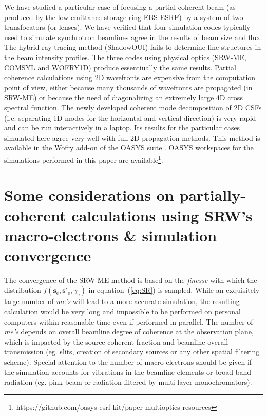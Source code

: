 \documentclass{iucr}              %
\begin{document}
We have studied a particular case of focusing a partial coherent beam (as produced by the low emittance storage ring EBS-ESRF) by a system of two transfocators (or lenses). We have verified that four simulation codes typically used to simulate synchrotron beamlines agree in the results of beam size and flux. The hybrid ray-tracing method (ShadowOUI) fails to determine fine structures in the beam intensity profiles. The three codes using physical optics (SRW-ME, COMSYL and WOFRY1D) produce essentiually the same results. Partial coherence calculations using 2D wavefronts are expensive from the computation point of view, either because many thousands of wavefronts are propagated (in SRW-ME) or because the need of diagonalizing an extremely large 4D cross spectral function. The newly developed coherent mode decomposition of 2D CSFs (i.e. separating 1D modes for the horizontal and vertical direction) is very rapid and can be run interactively in a laptop. Its results for the particular cases simulated here agree very well with full 2D propagation methods. 
This method is available in the Wofry add-on of the OASYS suite \cite{codeOASYS}. OASYS workspaces for the simulations performed in this paper are available\footnote{{ https://github.com/oasys-esrf-kit/paper-multioptics-resources}}.



\appendix

\section{Some considerations on partially-coherent calculations using SRW's macro-electrons \& simulation convergence}
\label{appendix:srw}

The convergence of the SRW-ME method is based on the \textit{finesse} with which the distribution $f(\textbf{s}_\text{e}, \textbf{s}'_\text{e}, \gamma_\text{e})$  in equation~(\ref{eq:SR}) is sampled. While an exquisitely large number of \textit{me's} will lead to a more accurate simulation, the resulting calculation would be very long and impossible to be performed on personal computers within reasonable time even if performed in parallel. The number of \textit{me's} depends on overall beamline degree of coherence at the observation plane, which is impacted by the source coherent fraction and beamline overall transmission (eg. slits, creation of secondary sources or any other spatial filtering scheme). Special attention to the number of macro-electrons should be given if the simulation accounts for vibrations in the beamline elements or broad-band radiation (eg. pink beam or radiation filtered by multi-layer monochromators).
\end{document}
